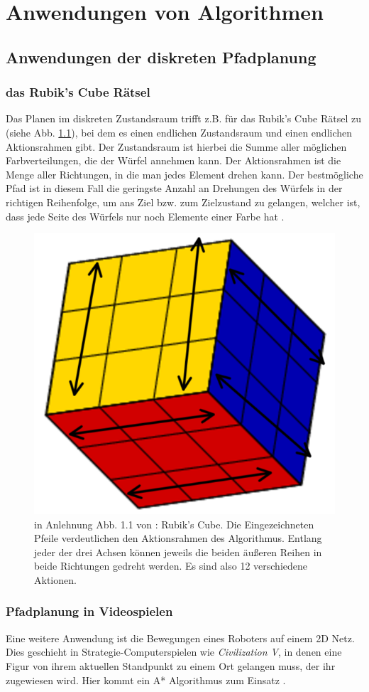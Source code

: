 
\chapter{Anwendungen von Algorithmen}
\section{Anwendungen der diskreten Pfadplanung}
\subsection{das Rubik's Cube Rätsel}
Das Planen im  diskreten Zustandsraum trifft z.B. für das Rubik's Cube Rätsel zu (siehe Abb. \ref{Abb. 4.1}), bei dem es einen endlichen Zustandsraum und einen endlichen Aktionsrahmen gibt. Der Zustandsraum ist hierbei die Summe aller möglichen Farbverteilungen, die der Würfel annehmen kann. Der Aktionsrahmen ist die Menge aller Richtungen, in die man jedes Element drehen kann. Der bestmögliche Pfad ist in diesem Fall die geringste Anzahl an Drehungen des Würfels in der richtigen Reihenfolge, um ans Ziel bzw. zum Zielzustand zu gelangen, welcher ist, dass jede Seite des Würfels nur noch Elemente einer Farbe hat \cite[~S. 30]{Lav06}.\\
\begin{figure}
	\centering
	\includegraphics[width=0.4\linewidth]{images/img229_a}
	\caption{in Anlehnung Abb. 1.1 von \cite[~S. 5]{Lav06}: Rubik's Cube. Die Eingezeichneten Pfeile verdeutlichen den Aktionsrahmen des Algorithmus. Entlang jeder der drei Achsen können jeweils die beiden äußeren Reihen in beide Richtungen gedreht werden. Es sind also 12 verschiedene Aktionen.}
	\label{Abb. 4.1}
\end{figure}%
\subsection{Pfadplanung in Videospielen}
Eine weitere Anwendung ist die Bewegungen eines Roboters auf einem 2D Netz. Dies geschieht in Strategie-Computerspielen wie \textit{Civilization V}, in denen eine Figur von ihrem aktuellen Standpunkt zu einem Ort gelangen muss, der ihr zugewiesen wird. Hier kommt ein A* Algorithmus zum Einsatz \cite[~S. 128]{cui:2011}.%
